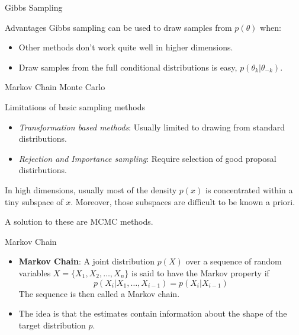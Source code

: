 \documentclass{beamer}
\begin{document}
\begin{section}{Gibbs Sampling}
    \begin{frame}{Advantages}
        Gibbs sampling can be used to draw samples from $p(\theta)$ when:\\
        \begin{itemize}
            \item Other methods don't work quite well in higher dimensions.
            \item Draw samples from the full conditional distributions is easy, $p(\theta_k|\theta_{-k}).$
        \end{itemize}
    \end{frame}
\end{section}

\begin{section}{Markov Chain Monte Carlo}
    \begin{frame}{Limitations of basic sampling methods}
        \begin{itemize}
            \item \textit{Transformation based methods}: Usually limited to drawing from standard distributions.
            \item \textit{Rejection and Importance sampling}: Require selection of good proposal distirbutions.
        \end{itemize}
        In high dimensions, usually most of the density $p(x)$ is concentrated within a tiny subspace of $x$. Moreover, those subspaces are difficult to be known a priori.

        A solution to these are MCMC methods.
    \end{frame}

    \begin{frame}{Markov Chain}
        \begin{itemize}
            \item \textbf{Markov Chain}: A joint distribution $p(X)$ over a sequence of random variables $X = \{X_1, X_2, \ldots, X_n\}$ is said to have the Markov property if 
            $$
            p(X_i|X_1, \ldots, X_{i-1}) = p(X_i|X_{i-1}) 
            $$
            The sequence is then called a Markov chain.
            \item The idea is that the estimates contain information about the shape of the target distribution $p$.
        \end{itemize}
    \end{frame}


\end{section}
\end{document}
